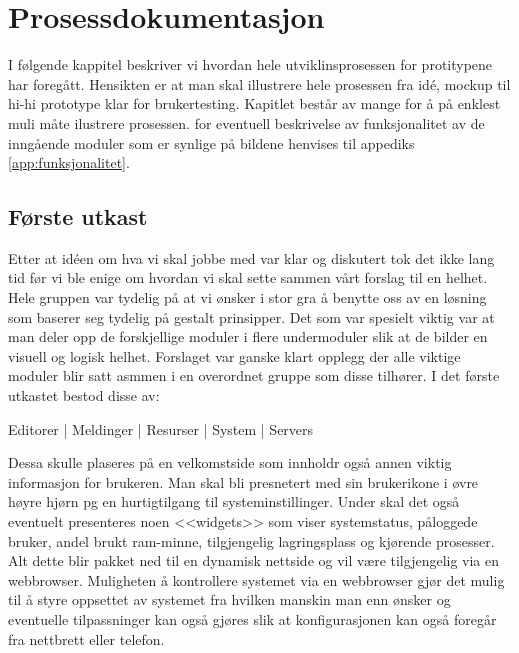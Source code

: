 \chapter{Prosessdokumentasjon}
\lettrine[lines=2]{I}{} følgende kappitel beskriver vi hvordan hele utviklinsprosessen for protitypene har foregått. Hensikten er at man skal illustrere hele prosessen fra idé, mockup til hi-hi prototype klar for brukertesting. Kapitlet består av mange for å på enklest muli måte ilustrere prosessen. for eventuell beskrivelse av funksjonalitet av de inngående moduler som er synlige på bildene henvises til appediks \ref{app:funksjonalitet}.




\section{Første utkast} \label{sec:utkast}
Etter at idéen om hva vi skal jobbe med var klar og diskutert tok det ikke lang tid før vi ble enige om hvordan vi skal sette sammen vårt forslag til en helhet. Hele gruppen var tydelig på at vi ønsker i stor gra å benytte oss av en løsning som baserer seg tydelig på gestalt prinsipper.
Det som var spesielt viktig var at man deler opp de forskjellige moduler i flere undermoduler slik at de bilder en visuell og logisk helhet. 
Forslaget var ganske klart opplegg der alle viktige moduler blir satt asmmen i en overordnet gruppe som disse tilhører. I det første utkastet bestod disse av:
\begin{center}
Editorer | Meldinger | Resurser | System | Servers
\end{center}
Dessa skulle plaseres på en velkomstside som innholdr også annen viktig informasjon for brukeren. Man skal bli presnetert med sin brukerikone i øvre høyre hjørn pg en hurtigtilgang til systeminstillinger. Under skal det også eventuelt presenteres noen <<widgets>> som viser systemstatus, påloggede bruker, andel brukt ram-minne, tilgjengelig lagringsplass og kjørende prosesser. Alt dette blir pakket ned til en dynamisk nettside og vil være tilgjengelig via en webbrowser. Muligheten å kontrollere systemet via en webbrowser gjør det mulig til å styre oppsettet av systemet fra hvilken manskin man enn ønsker og eventuelle tilpassninger kan også gjøres slik at konfigurasjonen kan også foregår fra nettbrett eller telefon.

